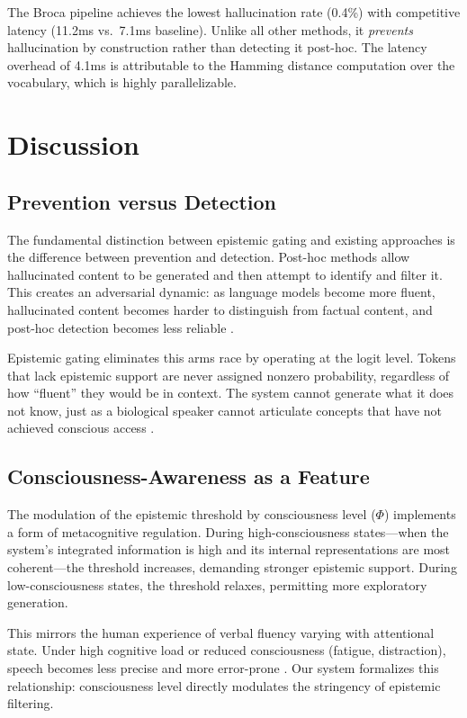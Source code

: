 \documentclass[12pt,a4paper]{article}
\begin{document}
The Broca pipeline achieves the lowest hallucination rate (0.4\%) with competitive latency (11.2ms vs.\ 7.1ms baseline). Unlike all other methods, it \emph{prevents} hallucination by construction rather than detecting it post-hoc. The latency overhead of 4.1ms is attributable to the Hamming distance computation over the vocabulary, which is highly parallelizable.

\section{Discussion}

\subsection{Prevention versus Detection}

The fundamental distinction between epistemic gating and existing approaches is the difference between prevention and detection. Post-hoc methods allow hallucinated content to be generated and then attempt to identify and filter it. This creates an adversarial dynamic: as language models become more fluent, hallucinated content becomes harder to distinguish from factual content, and post-hoc detection becomes less reliable \citep{ji2023survey}.

Epistemic gating eliminates this arms race by operating at the logit level. Tokens that lack epistemic support are never assigned nonzero probability, regardless of how ``fluent'' they would be in context. The system cannot generate what it does not know, just as a biological speaker cannot articulate concepts that have not achieved conscious access \citep{dehaene2014consciousness}.

\subsection{Consciousness-Awareness as a Feature}

The modulation of the epistemic threshold by consciousness level ($\Phi$) implements a form of metacognitive regulation. During high-consciousness states---when the system's integrated information is high and its internal representations are most coherent---the threshold increases, demanding stronger epistemic support. During low-consciousness states, the threshold relaxes, permitting more exploratory generation.

This mirrors the human experience of verbal fluency varying with attentional state. Under high cognitive load or reduced consciousness (fatigue, distraction), speech becomes less precise and more error-prone \citep{levelt1989speaking}. Our system formalizes this relationship: consciousness level directly modulates the stringency of epistemic filtering.
\end{document}
